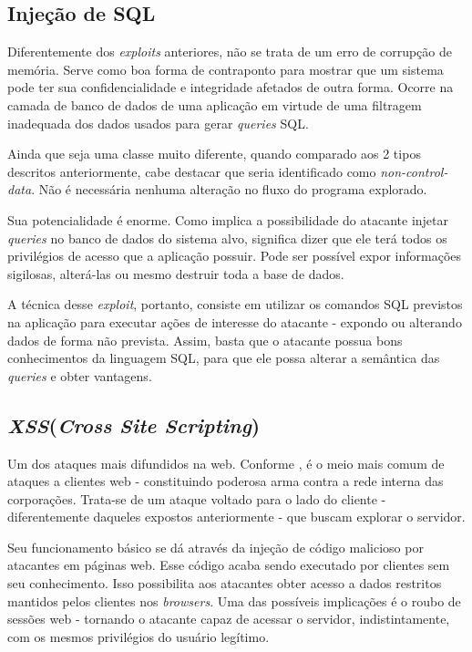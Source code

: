 				
		
		\subsection{Injeção de SQL}
			Diferentemente dos \textsl{exploits} anteriores, não se trata de um erro de corrupção
			de memória. Serve como boa forma de contraponto para mostrar que um sistema
			pode ter sua confidencialidade e integridade afetados de outra forma.
			Ocorre na camada de banco de dados de uma aplicação em virtude de uma filtragem inadequada
			dos dados usados para gerar \textsl{queries} SQL.			

			
			Ainda que seja uma classe muito diferente, quando comparado aos 2 tipos 
			descritos anteriormente, cabe destacar que seria identificado como 
			\textsl{non-control-data}. Não é necessária nenhuma alteração no fluxo do programa
			explorado.

			
			Sua potencialidade é enorme. Como implica a possibilidade do atacante
			injetar \textsl{queries} no banco de dados do sistema alvo, significa
			dizer que ele terá todos os privilégios de acesso que a aplicação possuir.
			Pode ser possível expor informações sigilosas, alterá-las ou mesmo destruir
			toda a base de dados.


			A técnica desse \textsl{exploit}, portanto, consiste em utilizar os comandos
			SQL previstos na aplicação para executar ações de interesse do atacante - expondo ou
			alterando dados de forma não prevista. Assim, basta que o atacante possua
			bons conhecimentos da linguagem SQL, para que ele possa alterar a semântica
			das \textsl{queries} e obter vantagens.

		\subsection{\textsl{XSS}(\textsl{Cross Site Scripting})}
			\label{subsec:xss}
			Um dos ataques mais difundidos na web. Conforme \cite{Dhanjani2009},
			é o meio mais comum de ataques a clientes web - constituindo poderosa arma
			contra a rede interna das corporações. Trata-se de um ataque voltado para o lado
			do cliente - diferentemente daqueles expostos anteriormente - que buscam explorar o servidor.


			Seu funcionamento básico se dá através da injeção de código malicioso por atacantes
			em páginas web. Esse código acaba sendo executado por clientes sem seu conhecimento.
			Isso possibilita aos atacantes obter acesso a dados restritos mantidos pelos clientes
			nos \textsl{browsers}. Uma das possíveis implicações é o roubo de sessões web - tornando
			o atacante capaz de acessar o servidor, indistintamente, com os mesmos privilégios
			do usuário legítimo.
			

